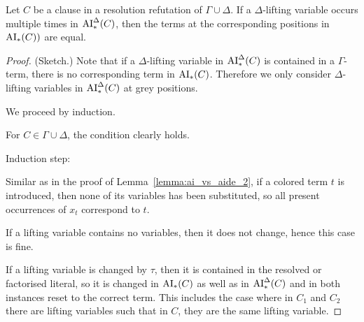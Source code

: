 \documentclass[,%
	draft=false,%
	numbers=noendperiod
	11pt,
	a4paper,
	oneside,%
	openany,
]{memoir}
\begin{document}
\begin{lemma}
	\label{lemma:ai_vs_aide_2}
	Let $C$ be a clause in a resolution refutation of $\Gamma\cup\Delta$.
	If a $\Delta$-lifting variable occurs multiple times in $\operatorname{AI}_\mathrm{*}^\Delta(C)$, then the terms at the corresponding positions in $\operatorname{AI}_\mathrm{*}(C))$ are equal.
\end{lemma}
\begin{proof}(Sketch.)
	Note that if a $\Delta$-lifting variable in $\operatorname{AI}_\mathrm{*}^\Delta(C)$ is contained in a $\Gamma$-term, there is no corresponding term in $\operatorname{AI}_\mathrm{*}(C)$. Therefore we only consider $\Delta$-lifting variables in $\operatorname{AI}_\mathrm{*}^\Delta(C)$ at grey positions.

	We proceed by induction.

	For $C \in \Gamma\cup\Delta$, the condition clearly holds.

	Induction step:

	Similar as in the proof of Lemma~\ref{lemma:ai_vs_aide_2}, if a colored term $t$ is introduced, then none of its variables has been substituted, so all present occurrences of $x_t$ correspond to $t$.

	If a lifting variable contains no variables, then it does not change, hence this case is fine.

	If a lifting variable is changed by $\tau$, then it is contained in the resolved or factorised literal, so it is changed in $\operatorname{AI}_\mathrm{*}(C)$ as well as in $\operatorname{AI}_\mathrm{*}^\Delta(C)$ and in both instances reset to the correct term.
	This includes the case where in $C_1$ and $C_2$ there are lifting variables such that in $C$, they are the same lifting variable.
	\qedhere
\end{proof}
\end{document}

